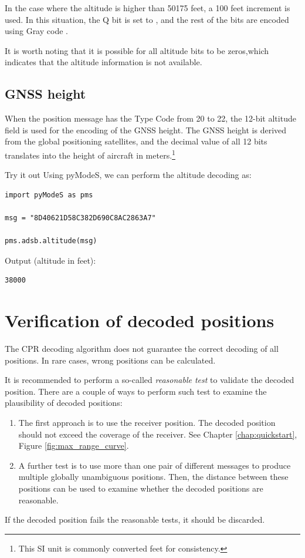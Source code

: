 In the case where the altitude is higher than 50175 feet, a 100 feet increment is used. In this situation, the Q bit is set to \0, and the rest of the bits are encoded using Gray code \cite{doran2007}. 

It is worth noting that it is possible for all altitude bits to be zeros,which indicates that the altitude information is not available.


\subsection{GNSS height}

When the position message has the Type Code from 20 to 22, the 12-bit altitude field is used for the encoding of the GNSS height. The GNSS height is derived from the global positioning satellites, and the decimal value of all 12 bits translates into the height of aircraft in meters.\footnote{This SI unit is commonly converted feet for consistency.}

\begin{notebox}{Try it out}
Using pyModeS, we can perform the altitude decoding as: 

\begin{verbatim}
import pyModeS as pms

msg = "8D40621D58C382D690C8AC2863A7"

pms.adsb.altitude(msg)
\end{verbatim}

Output (altitude in feet): 

\begin{verbatim}
38000
\end{verbatim}
\end{notebox}



\section{Verification of decoded positions}

The CPR decoding algorithm does not guarantee the correct decoding of all positions. In rare cases, wrong positions can be calculated. 

It is recommended to perform a so-called \emph{reasonable test} to validate the decoded position. There are a couple of ways to perform such test to examine the plausibility of decoded positions:

\begin{enumerate}
  \item The first approach is to use the receiver position. The decoded position should not exceed the coverage of the receiver. See Chapter \ref{chap:quickstart}, Figure \ref{fig:max_range_curve}.

  \item A further test is to use more than one pair of different messages to produce multiple globally unambiguous positions. Then, the distance between these positions can be used to examine whether the decoded positions are reasonable.
\end{enumerate}

If the decoded position fails the reasonable tests, it should be discarded.

